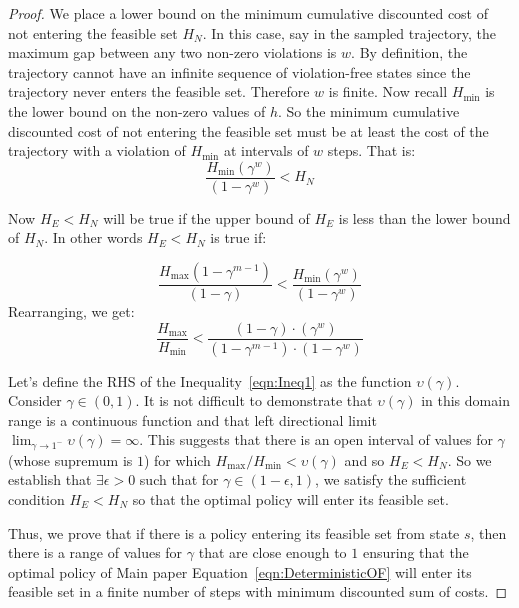 \documentclass{article}
\theoremstyle{definition}
\begin{document}
\begin{proof}
    We place a lower bound on the minimum cumulative discounted cost of not entering the feasible set $H_N$. In this case, say in the sampled trajectory, the maximum gap between any two non-zero violations is $w$. By definition, the trajectory cannot have an infinite sequence of violation-free states since the trajectory never enters the feasible set. Therefore $w$ is finite. Now recall $H_{\min}$ is the lower bound on the non-zero values of $h$. So the minimum cumulative discounted cost of not entering the feasible set must be at least the cost of the trajectory with a violation of $H_{\min}$ at intervals of $w$ steps. That is:
    \begin{equation*}
        \frac{H_{\min}(\gamma^{w})}{(1-\gamma^{w})} < H_N
    \end{equation*}

    Now $H_E < H_N$ will be true if the upper bound of $H_E$ is less than the lower bound of $H_N$. In other words $H_E < H_N$ is true if:
    
    \begin{equation}
        \frac{H_{\max}(1-\gamma^{m-1})}{(1-\gamma)} < \frac{H_{\min}(\gamma^{w})}{(1-\gamma^{w})}
    \end{equation}
    Rearranging, we get:
    \begin{equation}
    \label{eqn:Ineq1}
        \frac{H_{\max}}{H_{\min}} < \frac{(1-\gamma)\cdot (\gamma^{w})}{(1-\gamma^{m-1})\cdot(1-\gamma^{w})} 
    \end{equation}
    
    Let's define the RHS of the Inequality~\ref{eqn:Ineq1} as the function $\upsilon(\gamma)$. Consider $\gamma\in(0,1)$. It is not difficult to demonstrate that $\upsilon(\gamma)$ in this domain range is a continuous function and that left directional limit $\lim_{\gamma \to 1^{-}} \upsilon(\gamma)=\infty$. This suggests that there is an open interval of values for $\gamma$ (whose supremum is $1$) for which $H_{\max}/H_{\min} < \upsilon(\gamma)$ and so $H_E < H_N$. So we establish that $\exists \epsilon>0$ such that for $\gamma\in (1-\epsilon,1)$, we satisfy the sufficient condition $H_E < H_N$ so that the optimal policy will enter its feasible set.
    

    Thus, we prove that if there is a policy entering its feasible set from state $s$, then there is a range of values for $\gamma$ that are close enough to $1$ ensuring that the optimal policy of Main paper Equation~\ref{eqn:DeterministicOF} will enter its feasible set in a finite number of steps with minimum discounted sum of costs.



    
    




\end{proof}
\end{document}
